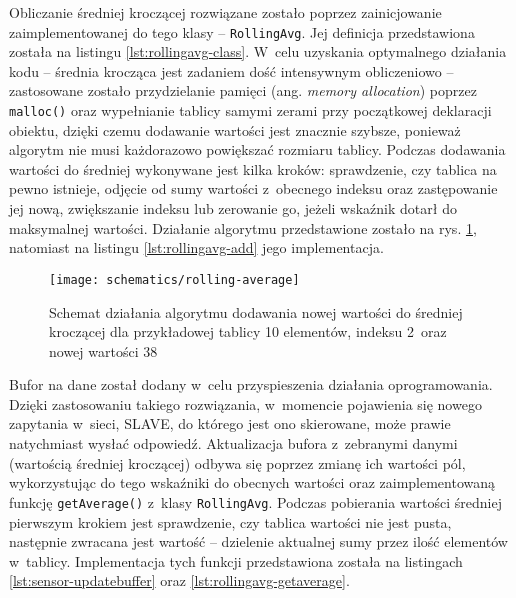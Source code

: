 Obliczanie średniej kroczącej rozwiązane zostało poprzez zainicjowanie zaimplementowanej do tego klasy --
\texttt{RollingAvg}. Jej definicja przedstawiona została na listingu \ref{lst:rollingavg-class}. W~celu uzyskania
optymalnego działania kodu -- średnia krocząca jest zadaniem dość intensywnym obliczeniowo -- zastosowane zostało
przydzielanie pamięci (ang. \textsl{memory allocation}) poprzez \texttt{malloc()} oraz wypełnianie tablicy samymi zerami
przy początkowej deklaracji obiektu, dzięki czemu dodawanie wartości jest znacznie szybsze, ponieważ algorytm nie musi
każdorazowo powiększać rozmiaru tablicy. Podczas dodawania wartości do średniej wykonywane jest kilka kroków:
sprawdzenie, czy tablica na pewno istnieje, odjęcie od sumy wartości z~obecnego indeksu oraz zastępowanie jej nową,
zwiększanie indeksu lub zerowanie go, jeżeli wskaźnik dotarł do maksymalnej wartości. Działanie algorytmu przedstawione
zostało na rys. \ref{img:rolling-average}, natomiast na listingu \ref{lst:rollingavg-add} jego implementacja.



\begin{figure}[!htbp]
    \centering
    \texttt{[image: schematics/rolling-average]}
    \caption{\label{img:rolling-average}Schemat działania algorytmu dodawania nowej wartości do średniej kroczącej dla
        przykładowej tablicy 10 elementów, indeksu 2~oraz nowej wartości 38}
\end{figure}



Bufor na dane został dodany w~celu przyspieszenia działania oprogramowania. Dzięki zastosowaniu takiego rozwiązania,
w~momencie pojawienia się nowego zapytania w~sieci, SLAVE, do którego jest ono skierowane, może prawie natychmiast
wysłać odpowiedź. Aktualizacja bufora z~zebranymi danymi (wartością średniej kroczącej) odbywa się poprzez zmianę ich
wartości pól, wykorzystując do tego wskaźniki do obecnych wartości oraz zaimplementowaną funkcję \texttt{getAverage()}
z~klasy \texttt{RollingAvg}. Podczas pobierania wartości średniej pierwszym krokiem jest sprawdzenie, czy tablica
wartości nie jest pusta, następnie zwracana jest wartość -- dzielenie aktualnej sumy przez ilość elementów w~tablicy.
Implementacja tych funkcji przedstawiona została na listingach \ref{lst:sensor-updatebuffer} oraz
\ref{lst:rollingavg-getaverage}.

